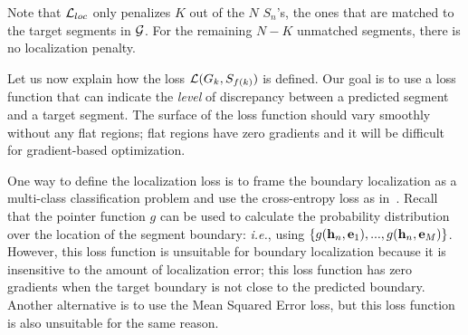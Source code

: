 \documentclass[10pt,journal,compsoc]{IEEEtran}
\begin{document}
Note that $\mathcal{L}_{loc}$ only penalizes $K$ out of the $N$ $S_n$'s, the ones that are matched to the target segments in $\mathcal{G}$. For the remaining $N-K$ unmatched segments, there is no localization penalty. 




 Let us now explain how the loss $\mathcal{L}(G_k, S_{f(k)})$ is defined. Our goal is to use a loss function that can indicate the {\em level} of discrepancy between a predicted segment and a target segment. The surface of the loss function should vary smoothly without any flat regions; flat regions have zero gradients and it will be difficult for gradient-based optimization.

One way to define the localization loss is to frame the boundary localization as a multi-class classification problem and use the cross-entropy loss as in~\cite{vinyals2015pointer}.  Recall that the pointer function $g$ can be used to calculate the probability distribution over the location of the segment boundary: \emph{i.e.}, using $\{g({\bf h}_n, {\bf e}_1), ..., g({\bf h}_n, {\bf e}_M)\}$. However, this loss function is unsuitable for boundary localization because it is insensitive to the amount of localization error; this loss function has zero gradients when the target boundary is not close to the predicted boundary. Another alternative is to use the Mean Squared Error loss, but this loss function is also unsuitable for the same reason. 
\end{document}
